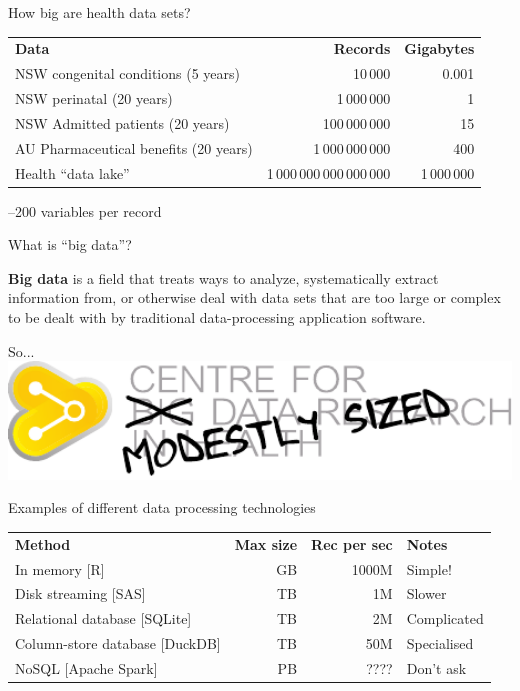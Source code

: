 \documentclass[aspectratio=169,12pt,usepdftitle=false]{beamer} %
\begin{document}

\begin{frame}{How big are health data sets?}
    \begin{tabular}{lrr}
	\textbf{Data} & \textbf{Records} & \textbf{Gigabytes} \\
	NSW congenital conditions (5 years)& 10\,000 & 0.001 \\
	NSW perinatal (20 years) & 1\,000\,000 & 1 \\
	NSW Admitted patients (20 years) & 100\,000\,000 & 15 \\
	AU Pharmaceutical benefits (20 years) & 1\,000\,000\,000 & 400 \\
	Health ``data lake'' & 1\,000\,000\,000\,000\,000 & 1\,000\,000 \\
    \end{tabular}\par
    --200 variables per record
\end{frame}

\begin{frame}{What is ``big data''?}
\centering
\begin{minipage}{0.8\textwidth}
\textbf{Big data} is a field that treats ways to analyze,
systematically extract information from, or otherwise deal with data sets
that are too large or complex to be dealt with by traditional
data-processing application software.
\end{minipage}
\end{frame}

\begin{frame}{So...}
\centering
\includegraphics[width=1.0\textwidth]
	{ref/cmsdrh.pdf}
\end{frame}

\begin{frame}{Examples of different data processing technologies}
    \begin{tabular}{lrrl}
	\textbf{Method} & \textbf{Max size} & \textbf{Rec per sec} &
		\textbf{Notes} \\
	In memory [R] & GB & 1000M & Simple! \\
	Disk streaming [SAS] & TB & 1M & Slower \\
	Relational database [SQLite] & TB & 2M & Complicated \\
	Column-store database [DuckDB] & TB & 50M & Specialised \\
	NoSQL [Apache Spark] & PB & ???? & Don't ask \\
    \end{tabular}
\end{frame}
\end{document}
